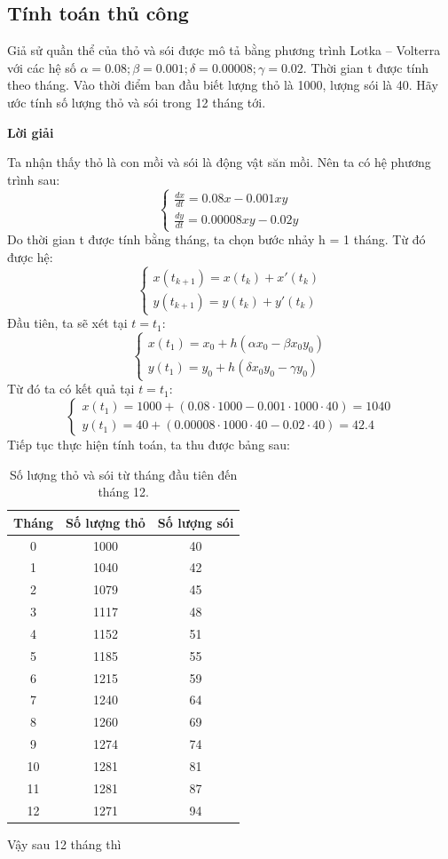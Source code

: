 \documentclass[a4paper,15pt]{article}
\begin{document}
\subsection{Tính toán thủ công}
Giả sử quần thể của thỏ và sói được mô tả bằng phương trình Lotka – Volterra với các hệ số $\alpha = 0.08; \beta = 0.001; \delta = 0.00008; \gamma = 0.02.$ Thời gian t được tính theo tháng. Vào thời điểm ban đầu biết lượng thỏ là 1000, lượng sói là 40. Hãy ước tính số lượng thỏ và sói trong 12 tháng tới.
\begin{center}
    \textbf{Lời giải}
\end{center}
Ta nhận thấy thỏ là con mồi và sói là động vật săn mồi. Nên ta có hệ phương trình sau:
\[
\begin{cases}
    \frac{dx}{dt} = 0.08 x - 0.001 x y \\
    \frac{dy}{dt} = 0.00008 x y - 0.02 y
\end{cases}
\]
Do thời gian t được tính bằng tháng, ta chọn bước nhảy h = 1 tháng. Từ đó được hệ:
\[
\begin{cases}
    x(t_{k+1}) = x(t_k) + x'(t_k) \\
    y(t_{k+1}) = y(t_k) + y'(t_k)
\end{cases}
\]
Đầu tiên, ta sẽ xét tại $t= t_1$:
\[
\begin{cases}
    x(t_1) = x_0 + h(\alpha  x_0 - \beta  x_0 y_0) \\
y(t_1) = y_0 + h(\delta x_0y_0 - \gamma y_0) 
\end{cases}
\]
Từ đó ta có kết quả tại $t= t_1$:
\[
\begin{cases}
    x(t_1) = 1000 + (0.08   \cdot 1000 - 0.001 \cdot 1000 \cdot 40) = 1040\\
    y(t_1) = 40 + ( 0.00008\cdot 1000 \cdot 40 - 0.02 \cdot 40) = 42.4
\end{cases}
\]
Tiếp tục thực hiện tính toán, ta thu được bảng sau:
\begin{table}[H]
\centering
\begin{tabular}{|c|c|c|}
\hline
\textbf{Tháng} & \textbf{Số lượng thỏ} & \textbf{Số lượng sói} \\
\hline
0  & 1000 & 40 \\
1  & 1040 & 42 \\
2  & 1079 & 45 \\
3  & 1117 & 48 \\
4  & 1152 & 51 \\
5  & 1185 & 55 \\
6  & 1215 & 59 \\
7  & 1240 & 64 \\
8  & 1260 & 69 \\
9  & 1274 & 74 \\
10 & 1281 & 81 \\
11 & 1281 & 87 \\
12 & 1271 & 94 \\
\hline
\end{tabular}
\caption{Số lượng thỏ và sói từ tháng đầu tiên đến tháng 12.}
\end{table}
Vậy sau 12 tháng thì
\end{document}
